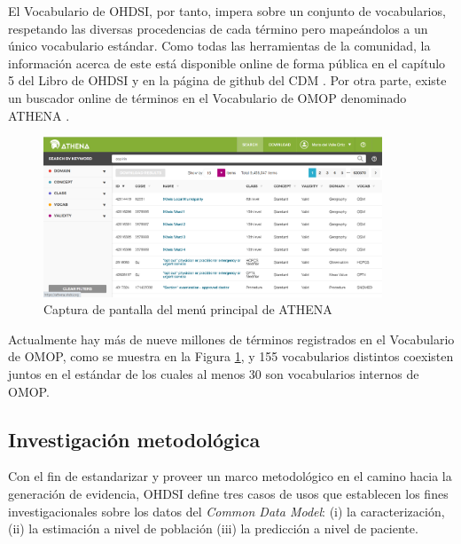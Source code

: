 El Vocabulario de OHDSI, por tanto, impera sobre un conjunto de vocabularios, respetando las diversas procedencias de cada término pero mapeándolos a un único vocabulario estándar.  Como todas las herramientas de la comunidad, la información acerca de este está disponible online de forma pública en el capítulo 5 del Libro de OHDSI \cite{OHDSIbook} y en la página de github del CDM \cite{gitPagesCMD}. Por otra parte, existe un buscador online de términos en el Vocabulario de OMOP denominado ATHENA \cite{ATHENAweb}. 

\begin{figure}[H]
\centering
\includegraphics[width=0.90\textwidth]{figures/ATHENAcap.png}
     \caption{Captura de pantalla del menú principal de ATHENA}
    \label{fig:ATHENAcap}
\end{figure}

Actualmente hay más de nueve millones de términos registrados en el Vocabulario de OMOP, como se muestra en la Figura \ref{fig:ATHENAcap}, y 155 vocabularios distintos coexisten juntos en el estándar de los cuales al menos 30 son vocabularios internos de OMOP.


\subsection{Investigación metodológica} \label{subsec:05investMetodolog}

Con el fin de estandarizar y proveer un marco metodológico en el camino hacia la generación de evidencia, OHDSI define tres casos de usos que establecen los fines investigacionales sobre los datos del \textit{Common Data Model}: (i) la caracterización, (ii) la estimación a nivel de población (iii) la predicción a nivel de paciente. 

